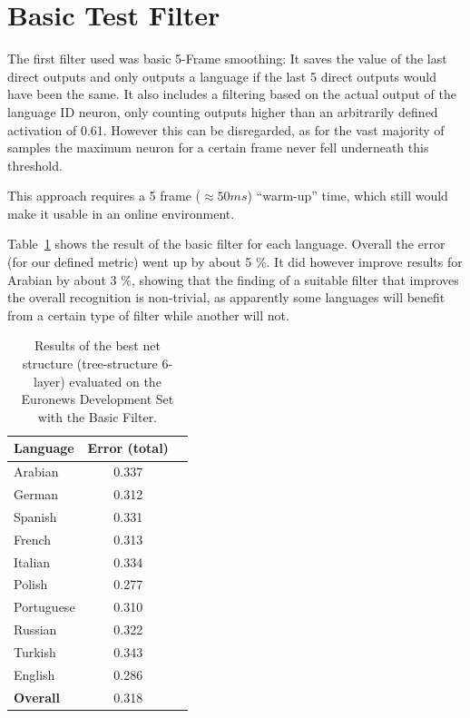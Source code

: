 \section{Basic Test Filter}
\label{sec:eval:basic}

The first filter used was basic 5-Frame smoothing: It saves the value of the last direct outputs and only outputs a language if the last 5 direct outputs would have been the same. It also includes a filtering based on the actual output of the language ID neuron, only counting outputs higher than an arbitrarily defined activation of 0.61. However this can be disregarded, as for the vast majority of samples the maximum neuron for a certain frame never fell underneath this threshold.

This approach requires a 5 frame (\(\approx 50 ms\)) ``warm-up'' time, which still would make it usable in an online environment.

Table~\ref{tab:basic} shows the result of the basic filter for each language. Overall the error (for our defined metric) went up by about 5 \%. It did however improve results for Arabian by about 3 \%, showing that the finding of a suitable filter that improves the overall recognition is non-trivial, as apparently some languages will benefit from a certain type of filter while another will not. 

\begin{table}[h!]
\centering
\caption{Results of the best net structure (tree-structure 6-layer) evaluated on the Euronews Development Set with the Basic Filter.}
\label{tab:basic}
\begin{tabular}{| l | c | r | }
	\hline
	\textbf{Language} & \textbf{Error (total)}  \\
	\hline
	Arabian & 0.337  \\
	German & 0.312  \\
	Spanish & 0.331 \\ 
	French & 0.313 \\
	Italian & 0.334  \\
	Polish & 0.277 \\
	Portuguese& 0.310  \\
	Russian&  0.322 \\
	Turkish&  0.343 \\
	English&  0.286 \\
	\hline
	\textbf{Overall} & 0.318 \\
	\hline
\end{tabular}
\end{table}


